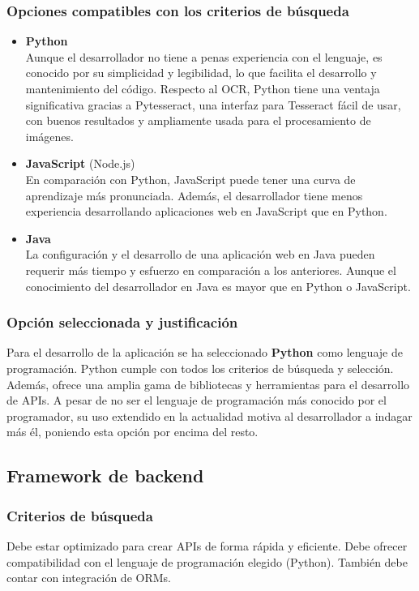 \subsubsection{Opciones compatibles con los criterios de búsqueda}
\begin{itemize}
    \item \textbf{Python}\\
        Aunque el desarrollador no tiene a penas experiencia con el lenguaje, es conocido por su simplicidad y legibilidad, lo que facilita el desarrollo y mantenimiento del código. Respecto al OCR, Python tiene una ventaja significativa gracias a Pytesseract, una interfaz para Tesseract fácil de usar, con buenos resultados y ampliamente usada para el procesamiento de imágenes.
    \item \textbf{JavaScript} (Node.js)\\
        En comparación con Python, JavaScript puede tener una curva de aprendizaje más pronunciada. Además, el desarrollador tiene menos experiencia desarrollando aplicaciones web en JavaScript que en Python.
    \item \textbf{Java}\\
        La configuración y el desarrollo de una aplicación web en Java pueden requerir más tiempo y esfuerzo en comparación a los anteriores. Aunque el conocimiento del desarrollador en Java es mayor que en Python o JavaScript.
\end{itemize}

\subsubsection{Opción seleccionada y justificación}
Para el desarrollo de la aplicación se ha seleccionado \textbf{Python} como lenguaje de programación. Python cumple con todos los criterios de búsqueda y selección. Además, ofrece una amplia gama de bibliotecas y herramientas para el desarrollo de APIs\cite{python2021python}. A pesar de no ser el lenguaje de programación más conocido por el programador, su uso extendido en la actualidad motiva al desarrollador a indagar más él, poniendo esta opción por encima del resto. 


\subsection{Framework de backend}
\subsubsection{Criterios de búsqueda}
Debe estar optimizado para crear APIs de forma rápida y eficiente.
Debe ofrecer compatibilidad con el lenguaje de programación elegido (Python). También debe contar con integración de ORMs.

